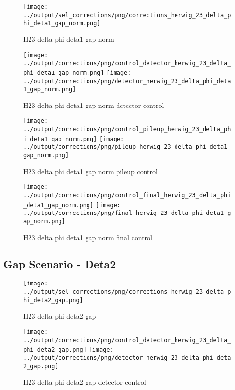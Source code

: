 \documentclass[11pt]{book}
\begin{document}
\begin{figure}[ht]
\centering
\texttt{[image: ../output/sel\_corrections/png/corrections\_herwig\_23\_delta\_phi\_deta1\_gap\_norm.png]}
\caption{H23 delta phi deta1 gap norm}
\label{fig:H23_delta_phi_deta1_gap_norm}
\end{figure}

\begin{figure}[ht]
\centering
\texttt{[image: ../output/corrections/png/control\_detector\_herwig\_23\_delta\_phi\_deta1\_gap\_norm.png]}
\texttt{[image: ../output/corrections/png/detector\_herwig\_23\_delta\_phi\_deta1\_gap\_norm.png]}
\caption{H23 delta phi deta1 gap norm detector control}
\label{fig:H23_delta_phi_deta1_gap_norm_detector_control}
\end{figure}

\begin{figure}[ht]
\centering
\texttt{[image: ../output/corrections/png/control\_pileup\_herwig\_23\_delta\_phi\_deta1\_gap\_norm.png]}
\texttt{[image: ../output/corrections/png/pileup\_herwig\_23\_delta\_phi\_deta1\_gap\_norm.png]}
\caption{H23 delta phi deta1 gap norm pileup control}
\label{fig:H23_delta_phi_deta1_gap_norm_pileup_control}
\end{figure}


\begin{figure}[ht]
\centering
\texttt{[image: ../output/corrections/png/control\_final\_herwig\_23\_delta\_phi\_deta1\_gap\_norm.png]}
\texttt{[image: ../output/corrections/png/final\_herwig\_23\_delta\_phi\_deta1\_gap\_norm.png]}
\caption{H23 delta phi deta1 gap norm final control}
\label{fig:H23_delta_phi_deta1_gap_norm_final_control}
\end{figure}



\clearpage
\subsection{Gap Scenario - Deta2}
\begin{figure}[ht]
\centering
\texttt{[image: ../output/sel\_corrections/png/corrections\_herwig\_23\_delta\_phi\_deta2\_gap.png]}
\caption{H23 delta phi deta2 gap}
\label{fig:H23_delta_phi_deta2_gap}
\end{figure}


\begin{figure}[ht]
\centering
\texttt{[image: ../output/corrections/png/control\_detector\_herwig\_23\_delta\_phi\_deta2\_gap.png]}
\texttt{[image: ../output/corrections/png/detector\_herwig\_23\_delta\_phi\_deta2\_gap.png]}
\caption{H23 delta phi deta2 gap detector control}
\label{fig:H23_delta_phi_deta2_gap_detector_control}
\end{figure}
\end{document}
